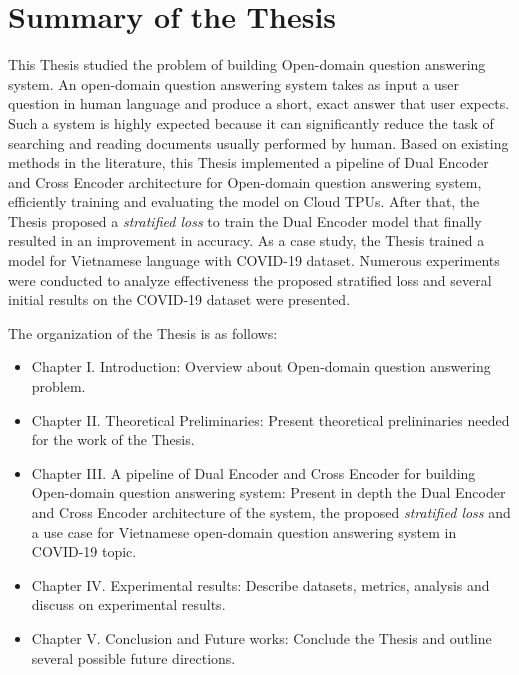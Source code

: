 \documentclass[12pt, sort&compress]{report}
\begin{document}
\chapter*{Summary of the Thesis}
This Thesis studied the problem of building Open-domain question answering system. An open-domain question answering system takes as input a user question in human language and produce a short, exact answer that user expects. Such a system is highly expected because it can significantly reduce the task of searching and reading documents usually performed by human. Based on existing methods in the literature, this Thesis implemented a pipeline of Dual Encoder and Cross Encoder architecture for Open-domain question answering system, efficiently training and evaluating the model on Cloud TPUs. After that, the Thesis proposed a \textit{stratified loss} to train the Dual Encoder model that finally resulted in an improvement in accuracy. As a case study, the Thesis trained a model for Vietnamese language with COVID-19 dataset. Numerous experiments were conducted to analyze effectiveness the proposed stratified loss and several initial results on the COVID-19 dataset were presented.
\par The organization of the Thesis is as follows:
\begin{itemize}
	\item Chapter I. Introduction: Overview about Open-domain question answering problem.
	\item Chapter II. Theoretical Preliminaries: Present theoretical prelininaries needed for the work of the Thesis.
	\item Chapter III. A pipeline of Dual Encoder and Cross Encoder for building Open-domain question answering system: Present in depth the Dual Encoder and Cross Encoder architecture of the system, the proposed \textit{stratified loss} and a use case for Vietnamese open-domain question answering system in COVID-19 topic.
	\item Chapter IV. Experimental results: Describe datasets, metrics, analysis and discuss on experimental results.
	\item Chapter V. Conclusion and Future works: Conclude the Thesis and outline several possible future directions.
\end{itemize}
\tableofcontents
%
\newpage
\renewcommand{\arraystretch}{1.25}
\end{document}
